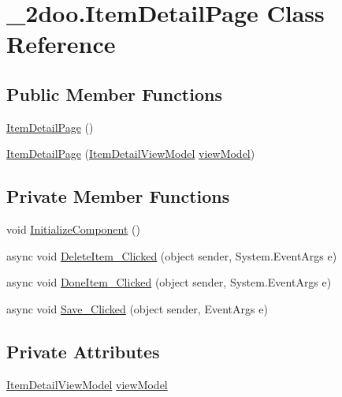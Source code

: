 \hypertarget{class__2doo_1_1_item_detail_page}{
\section{\_\-2doo.ItemDetailPage Class Reference}
\label{class__2doo_1_1_item_detail_page}
}
\subsection*{Public Member Functions}
\begin{CompactItemize}
\item 
\hyperlink{class__2doo_1_1_item_detail_page_f9128dbdf514d34545281a147fbe0d2f}{ItemDetailPage} ()
\item 
\hyperlink{class__2doo_1_1_item_detail_page_25701813c6a3d5ffa7b91d012b3084c1}{ItemDetailPage} (\hyperlink{class__2doo_1_1_item_detail_view_model}{ItemDetailViewModel} \hyperlink{class__2doo_1_1_item_detail_page_4e42bad0d16168025caaaed945451a8d}{viewModel})
\end{CompactItemize}
\subsection*{Private Member Functions}
\begin{CompactItemize}
\item 
void \hyperlink{class__2doo_1_1_item_detail_page_4bc5039db0e4bfbf7d08f1437f9fe386}{InitializeComponent} ()
\item 
async void \hyperlink{class__2doo_1_1_item_detail_page_075dd61572948253c0a396b343813395}{DeleteItem\_\-Clicked} (object sender, System.EventArgs e)
\item 
async void \hyperlink{class__2doo_1_1_item_detail_page_22435577b872f8d70e0db423792bd600}{DoneItem\_\-Clicked} (object sender, System.EventArgs e)
\item 
async void \hyperlink{class__2doo_1_1_item_detail_page_39431cea797e82cfbbed62fdba2178f2}{Save\_\-Clicked} (object sender, EventArgs e)
\end{CompactItemize}
\subsection*{Private Attributes}
\begin{CompactItemize}
\item 
\hyperlink{class__2doo_1_1_item_detail_view_model}{ItemDetailViewModel} \hyperlink{class__2doo_1_1_item_detail_page_4e42bad0d16168025caaaed945451a8d}{viewModel}
\end{CompactItemize}


